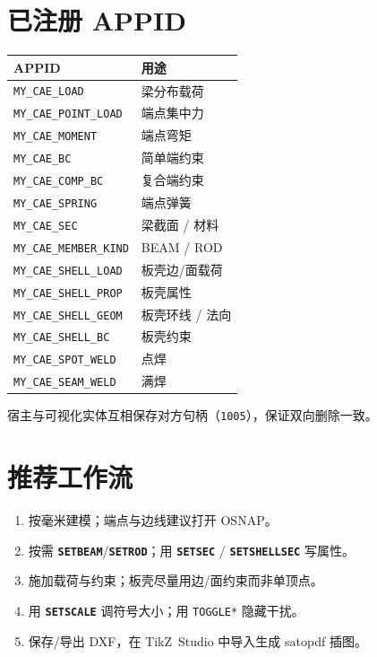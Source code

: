 \documentclass[a4paper]{ltxdoc}
\newcommand{\cadcmd}[1]{\texttt{\textbf{#1}}}
\newcommand{\appid}[1]{\texttt{#1}}
\begin{document}
\section{已注册 APPID}

\begin{center}
\begin{tabular}{@{}ll@{}}
\toprule
APPID & 用途 \\
\midrule
\appid{MY\_CAE\_LOAD}         & 梁分布载荷 \\
\appid{MY\_CAE\_POINT\_LOAD}  & 端点集中力 \\
\appid{MY\_CAE\_MOMENT}       & 端点弯矩 \\
\appid{MY\_CAE\_BC}           & 简单端约束 \\
\appid{MY\_CAE\_COMP\_BC}     & 复合端约束 \\
\appid{MY\_CAE\_SPRING}       & 端点弹簧 \\
\appid{MY\_CAE\_SEC}          & 梁截面 / 材料 \\
\appid{MY\_CAE\_MEMBER\_KIND} & BEAM / ROD \\
\appid{MY\_CAE\_SHELL\_LOAD}  & 板壳边/面载荷 \\
\appid{MY\_CAE\_SHELL\_PROP}  & 板壳属性 \\
\appid{MY\_CAE\_SHELL\_GEOM}  & 板壳环线 / 法向 \\
\appid{MY\_CAE\_SHELL\_BC}    & 板壳约束 \\
\appid{MY\_CAE\_SPOT\_WELD}   & 点焊 \\
\appid{MY\_CAE\_SEAM\_WELD}   & 满焊 \\
\bottomrule
\end{tabular}
\end{center}

宿主与可视化实体互相保存对方句柄（\texttt{1005}），保证双向删除一致。

\section{推荐工作流}

\begin{enumerate}[nosep]
  \item 按毫米建模；端点与边线建议打开 OSNAP。
  \item 按需 \cadcmd{SETBEAM}/\cadcmd{SETROD}；用 \cadcmd{SETSEC} /
        \cadcmd{SETSHELLSEC} 写属性。
  \item 施加载荷与约束；板壳尽量用边/面约束而非单顶点。
  \item 用 \cadcmd{SETSCALE} 调符号大小；用 \texttt{TOGGLE*} 隐藏干扰。
  \item 保存/导出 DXF，在 TikZ~Studio 中导入生成 \textsf{satopdf} 插图。
\end{enumerate}
\end{document}

